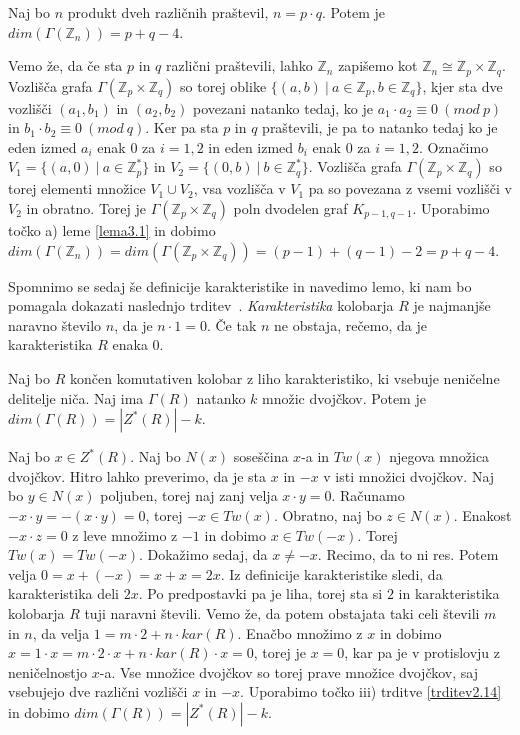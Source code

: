 \documentclass[mat1, tisk]{fmfdelo}
\newcommand{\Z}{\mathbb Z}
\begin{document}
%
\begin{trditev}
  Naj bo $n$ produkt dveh različnih praštevil, $n = p \cdot q$. Potem je 
  $dim(\Gamma(\Z_{n})) = p + q - 4$.
\end{trditev}
\begin{dokaz}
  Vemo že, da če sta $p$ in $q$ različni praštevili, lahko $\Z_{n}$ zapišemo kot 
  $\Z_{n} \cong \Z_{p} \times \Z_{q}$. Vozlišča grafa $\Gamma(\Z_{p} \times \Z_{q})$ so 
  torej oblike $ \{(a,b)~|~a \in \Z_{p}, b \in \Z_{q}\}$, kjer sta dve vozlišči $(a_1, b_1)$ in 
  $(a_2, b_2)$ povezani natanko tedaj, ko je $a_1 \cdot a_2 \equiv 0~(mod~p)$ in $b_1 \cdot b_2 \equiv 0~(mod~q)$. 
  Ker pa sta $p$ in $q$ praštevili, je pa to natanko tedaj ko je eden izmed $a_i$ enak $0$ za $i = 1,2$ 
  in eden izmed $b_i$ enak $0$ za $i = 1,2$. Označimo $V_1 =\{ (a,0)~|~a \in \Z_{p}^*\}$ in 
  $V_2 =\{ (0,b)~|~b \in \Z_{q}^*\}$. Vozlišča grafa $\Gamma(\Z_{p} \times \Z_{q})$ so torej 
  elementi množice $V_1 \cup V_2$, vsa 
  vozlišča v $V_1$ pa so povezana z vsemi vozlišči v $V_2$ in obratno. 
  Torej je $\Gamma(\Z_{p} \times \Z_{q})$ poln dvodelen graf $K_{p-1, q-1}$. Uporabimo točko a)
  leme \ref{lema3.1} in dobimo $dim(\Gamma(\Z_{n})) = dim(\Gamma(\Z_{p} \times \Z_{q})) = (p - 1) + (q - 1) - 2 = p + q - 4$.
\end{dokaz}
%
Spomnimo se sedaj še definicije karakteristike in navedimo lemo, ki nam bo pomagala dokazati 
naslednjo trditev~\cite{PIRZADA2019}. \emph{Karakteristika} kolobarja $R$ je najmanjše naravno število $n$, da je 
$n \cdot 1 = 0$. Če tak $n$ ne obstaja, rečemo, da je karakteristika $R$ enaka $0$.
%
\begin{lema}\label{lema3.3}
  Naj bo $R$ končen komutativen kolobar z liho karakteristiko, ki vsebuje neničelne delitelje niča. Naj 
  ima $\Gamma(R)$ natanko $k$ množic dvojčkov. Potem je $dim(\Gamma(R)) = |Z^*(R)| - k$.
\end{lema}
\begin{dokaz}
  Naj bo $x \in Z^*(R)$. Naj bo $N(x)$ soseščina $x$-a in $Tw(x)$ njegova množica dvojčkov. Hitro lahko 
  preverimo, da je sta $x$ in $-x$ v isti množici dvojčkov. Naj bo $y \in N(x)$ poljuben, torej naj zanj 
  velja $x \cdot y = 0$. Računamo $-x \cdot y = - (x \cdot y)= 0$, torej $-x \in Tw(x)$. Obratno, naj 
  bo $z \in N(x)$. Enakost $-x \cdot z = 0$ z leve množimo z $-1$ in dobimo $x \in Tw(-x)$. Torej 
  $Tw(x) = Tw(-x)$. Dokažimo sedaj, da $x \neq -x$. Recimo, da to ni res. Potem velja $0 = x + (-x) = x + x = 2x$. 
  Iz definicije karakteristike sledi, da karakteristika deli $2x$. Po predpostavki pa je liha, torej 
  sta si $2$ in karakteristika kolobarja $R$ tuji naravni števili. Vemo že, da potem obstajata taki 
  celi števili $m$ in $n$, da velja $1 = m \cdot 2 + n \cdot kar(R)$. Enačbo množimo z $x$ in 
  dobimo $x = 1 \cdot x = m \cdot 2 \cdot x + n \cdot kar(R) \cdot x = 0$, torej je $x = 0$, 
  kar pa je v protislovju z 
  neničelnostjo $x$-a. Vse množice dvojčkov so torej prave množice dvojčkov, saj vsebujejo dve različni 
  vozlišči $x$ in $-x$. Uporabimo točko iii) trditve \ref{trditev2.14} in dobimo $dim(\Gamma(R)) = |Z^*(R)| - k$.
\end{dokaz}
\end{document}
